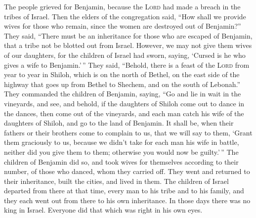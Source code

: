  The people grieved for Benjamin, because the
\textsc{Lord} had made a breach in the tribes of Israel. 
Then the elders of the congregation said, ``How shall we provide wives
for those who remain, since the women are destroyed out of Benjamin?''
 They said, ``There must be an inheritance for those who
are escaped of Benjamin, that a tribe not be blotted out from Israel.
 However, we may not give them wives of our daughters,
for the children of Israel had sworn, saying, `Cursed is he who gives a
wife to Benjamin.'\,''  They said, ``Behold, there is a
feast of the \textsc{Lord} from year to year in Shiloh, which is on the
north of Bethel, on the east side of the highway that goes up from
Bethel to Shechem, and on the south of Lebonah.''  They
commanded the children of Benjamin, saying, ``Go and lie in wait in the
vineyards,  and see, and behold, if the daughters of
Shiloh come out to dance in the dances, then come out of the vineyards,
and each man catch his wife of the daughters of Shiloh, and go to the
land of Benjamin.  It shall be, when their fathers or
their brothers come to complain to us, that we will say to them, `Grant
them graciously to us, because we didn't take for each man his wife in
battle, neither did you give them to them; otherwise you would now be
guilty.'\,''  The children of Benjamin did so, and took
wives for themselves according to their number, of those who danced,
whom they carried off. They went and returned to their inheritance,
built the cities, and lived in them.  The children of
Israel departed from there at that time, every man to his tribe and to
his family, and they each went out from there to his own inheritance.
 In those days there was no king in Israel. Everyone did
that which was right in his own eyes.
